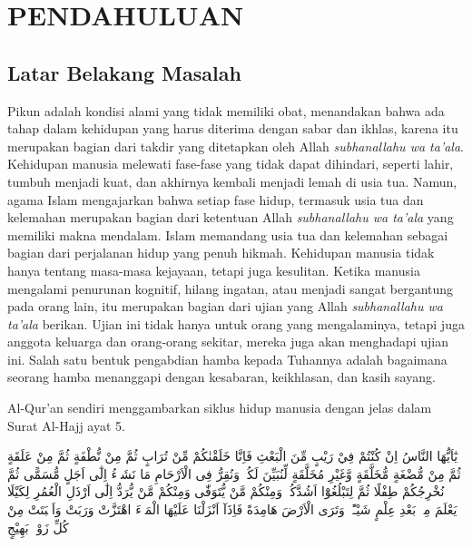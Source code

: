 \chapter{PENDAHULUAN}
    \section{Latar Belakang Masalah}

    Pikun adalah kondisi alami yang tidak memiliki obat, menandakan bahwa ada tahap dalam kehidupan yang harus diterima dengan sabar dan ikhlas, karena itu merupakan bagian dari takdir yang ditetapkan oleh Allah \textit{subhanallahu wa ta'ala}. Kehidupan manusia melewati fase-fase yang tidak dapat dihindari, seperti lahir, tumbuh menjadi kuat, dan akhirnya kembali menjadi lemah di usia tua. Namun, agama Islam mengajarkan bahwa setiap fase hidup, termasuk usia tua dan kelemahan merupakan bagian dari ketentuan Allah \textit{subhanallahu wa ta'ala} yang memiliki makna mendalam. Islam memandang usia tua dan kelemahan sebagai bagian dari perjalanan hidup yang penuh hikmah. Kehidupan manusia tidak hanya tentang masa-masa kejayaan, tetapi juga kesulitan. Ketika manusia mengalami penurunan kognitif, hilang ingatan, atau menjadi sangat bergantung pada orang lain, itu merupakan bagian dari ujian yang Allah \textit{subhanallahu wa ta'ala} berikan. Ujian ini tidak hanya untuk orang yang mengalaminya, tetapi juga anggota keluarga dan orang-orang sekitar, mereka juga akan menghadapi ujian ini. Salah satu bentuk pengabdian hamba kepada Tuhannya adalah bagaimana seorang hamba menanggapi dengan kesabaran, keikhlasan, dan kasih sayang.

    Al-Qur'an sendiri menggambarkan siklus hidup manusia dengan jelas dalam Surat Al-Hajj ayat 5.

    \begin{flushright}
        \begin{RLtext}
            يٰٓاَيُّهَا النَّاسُ اِنْ كُنْتُمْ فِيْ رَيْبٍ مِّنَ الْبَعْثِ فَاِنَّا خَلَقْنٰكُمْ مِّنْ تُرَابٍ ثُمَّ مِنْ نُّطْفَةٍ ثُمَّ مِنْ عَلَقَةٍ ثُمَّ مِنْ مُّضْغَةٍ مُّخَلَّقَةٍ وَّغَيْرِ مُخَلَّقَةٍ لِّنُبَيِّنَ لَكُمْۗ وَنُقِرُّ فِى الْاَرْحَامِ مَا نَشَاۤءُ اِلٰٓى اَجَلٍ مُّسَمًّى ثُمَّ نُخْرِجُكُمْ طِفْلًا ثُمَّ لِتَبْلُغُوْٓا اَشُدَّكُمْۚ وَمِنْكُمْ مَّنْ يُّتَوَفّٰى وَمِنْكُمْ مَّنْ يُّرَدُّ اِلٰٓى اَرْذَلِ الْعُمُرِ لِكَيْلَا يَعْلَمَ مِنْۢ بَعْدِ عِلْمٍ شَيْـًٔاۗ وَتَرَى الْاَرْضَ هَامِدَةً فَاِذَآ اَنْزَلْنَا عَلَيْهَا الْمَاۤءَ اهْتَزَّتْ وَرَبَتْ وَاَنْۢبَتَتْ مِنْ كُلِّ زَوْجٍۢ بَهِيْجٍ
        \end{RLtext}
    \end{flushright}
    
